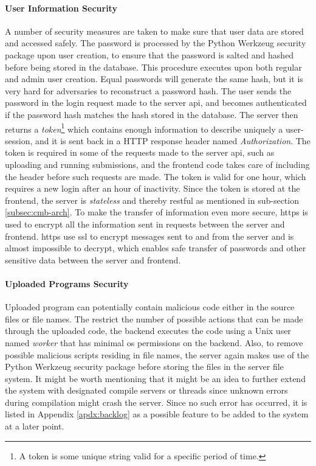 \paragraph*{User Information Security} A number of security measures are taken to make sure that user data are stored and accessed safely. The password is processed by the Python Werkzeug security package \cite{WERKZEUG} upon user creation, to ensure that the password is salted and hashed before being stored in the database. This procedure executes upon both regular and admin user creation. Equal passwords will generate the same hash, but it is very hard for adversaries to reconstruct a password hash. The user sends the password in the login request made to the server \gls{api}, and becomes authenticated if the password hash matches the hash stored in the database. The server then returns a \textit{token}\footnote{A token is some unique string valid for a specific period of time.} which contains enough information to describe uniquely a user-session, and it is sent back in a HTTP response header named \textit{Authorization}. The token is required in some of the requests made to the server \gls{api}, such as uploading and running submissions, and the frontend code takes care of including the header before such requests are made. The token is valid for one hour, which requires a new login after an hour of inactivity. Since the token is stored at the frontend, the server is \textit{stateless} and thereby \gls{rest}ful as mentioned in sub-section \ref{subsec:cmb-arch}. To make the transfer of information even more secure, \gls{https} is used to encrypt all the information sent in requests between the server and frontend. \gls{https} use \gls{ssl} to encrypt messages sent to and from the server and is almost impossible to decrypt, which enables safe transfer of passwords and other sensitive data between the server and frontend.

\paragraph*{Uploaded Programs Security} Uploaded program can potentially contain malicious code either in the source files or file names. The restrict the number of possible actions that can be made through the uploaded code, the backend executes the code using a Unix user named \textit{worker} that has minimal \gls{os} permissions on the backend. Also, to remove possible malicious scripts residing in file names, the server again makes use of the Python Werkzeug security package \cite{WERKZEUG} before storing the files in the server file system. It might be worth mentioning that it might be an idea to further extend the system with designated compile servers or threads since unknown errors during compilation might crash the server. Since no such error has occurred, it is listed in Appendix \ref{apdx:backlog} as a possible feature to be added to the system at a later point.

